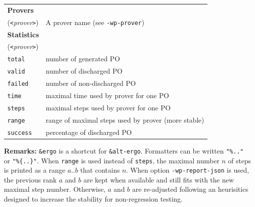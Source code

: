 \begin{center}
  \begin{tabular}{ll}
    \hline
    \textbf{Provers} \\
    (\verb+<+{\it prover}\verb+>+) & A prover name (see \texttt{-wp-prover}) \\
    \hline
    \hline
    \textbf{Statistics} \\
    (\verb+<+{\it prover}\verb+>+) \\
    \verb+total+ & number of generated PO \\
    \verb+valid+ & number of discharged PO \\
    \verb+failed+ & number of non-discharged PO \\
    \verb+time+ & maximal time used by prover for one PO \\
    \verb+steps+ & maximal steps used by prover for one PO \\
    \verb+range+ & range of maximal steps used by prover (more stable)\\
    \verb+success+ & percentage of discharged PO \\
    \hline
  \end{tabular}
\end{center}

\textbf{Remarks:} \verb+&ergo+ is a shortcut for \verb+&alt-ergo+. Formatters
can be written \verb+"%.."+ or \verb+"%{..}"+. When \verb+range+ is used
instead of \verb+steps+, the maximal number $n$ of steps is printed as a range $a..b$ that
contains $n$.
When option \verb+-wp-report-json+ is used, the previous rank $a$ and $b$ are kept when
available and still fits with the new maximal step number. Otherwise, $a$ and $b$ are re-adjusted
following an heurisitics designed to increase the stability for non-regression testing.

